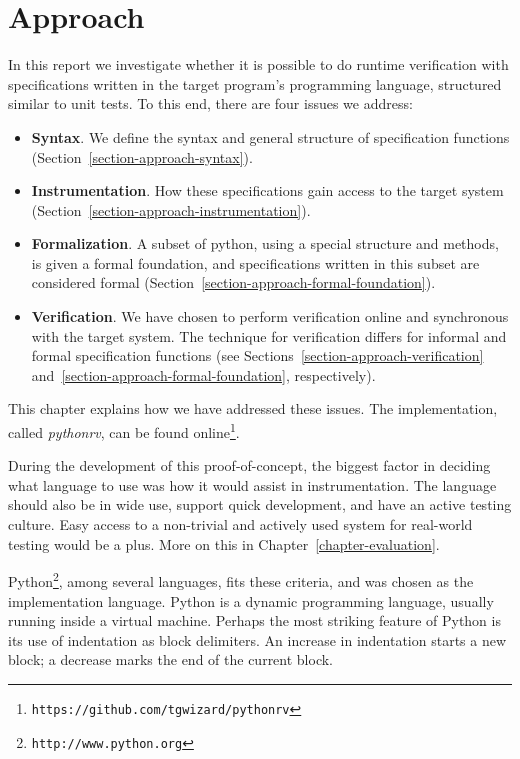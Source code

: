 
\pagestyle{newchap}
\chapter{Approach} \label{chapter-approach}
\lstset{language=Python}

In this report we investigate whether it is possible to do runtime verification
with specifications written in the target program's programming language,
structured similar to unit tests. To this end, there are four issues we
address:

\begin{itemize}
  \item \textbf{Syntax}. We define the syntax and general structure of
    specification functions (Section~\ref{section-approach-syntax}).
  \item \textbf{Instrumentation}. How these specifications gain access to the
    target system (Section~\ref{section-approach-instrumentation}).
  \item \textbf{Formalization}. A subset of python, using a special structure
    and methods, is given a formal foundation, and specifications written in
    this subset are
    considered formal (Section~\ref{section-approach-formal-foundation}).
  \item \textbf{Verification}. We have chosen to perform verification online
    and synchronous with the target system. The technique for verification
    differs for informal and formal specification functions (see
    Sections~\ref{section-approach-verification}
    and~\ref{section-approach-formal-foundation}, respectively).
\end{itemize}

This chapter explains how we have addressed these issues. The implementation,
called \textit{pythonrv}, can be found
online\footnote{\texttt{https://github.com/tgwizard/pythonrv}}.

During the development of this proof-of-concept, the biggest factor in deciding
what language to use was how it would assist in instrumentation. The language
should also be in wide use, support quick development, and have an active
testing culture. Easy access to a non-trivial and actively used system for
real-world testing would be a plus. More on this in
Chapter~\ref{chapter-evaluation}.

Python\footnote{\texttt{http://www.python.org}}, among several languages, fits
these criteria, and was chosen as the implementation language. Python is a
dynamic programming language, usually running inside a virtual machine.
Perhaps the most striking feature of Python is its use of indentation as block
delimiters. An increase in indentation starts a new block; a decrease marks the
end of the current block.

